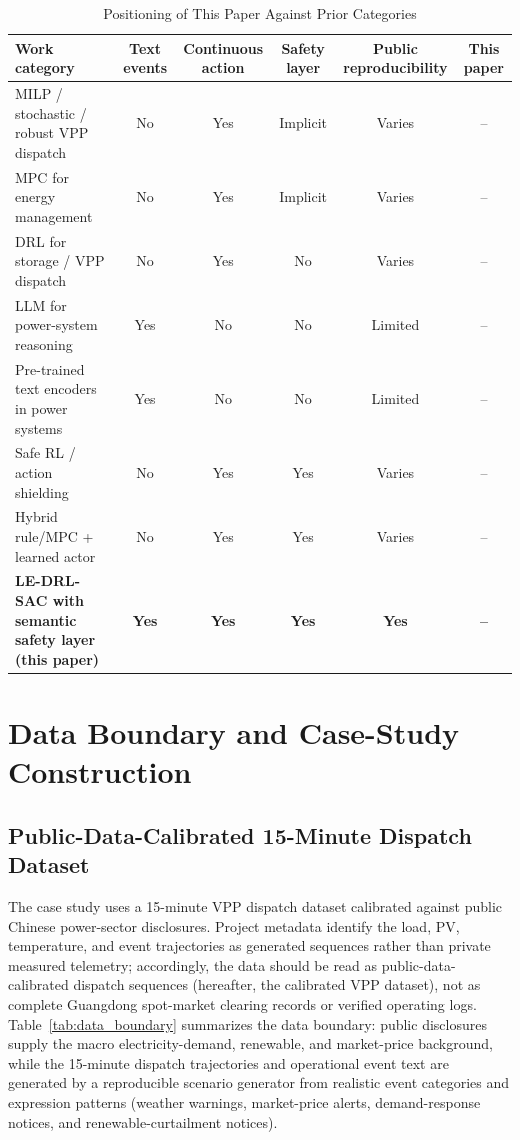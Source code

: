 \documentclass{ieeeaccess}
\begin{document}
\begin{table}[t!]
\caption{Positioning of This Paper Against Prior Categories}
\label{tab:related_position}
\centering
\begin{tabular}{lccccc}
\toprule
\textbf{Work category} & \textbf{Text events} & \textbf{Continuous action} & \textbf{Safety layer} & \textbf{Public reproducibility} & \textbf{This paper} \\
\midrule
MILP / stochastic / robust VPP dispatch \cite{b10,b13,b14,b15} & No & Yes & Implicit & Varies & -- \\
MPC for energy management \cite{b7,b16} & No & Yes & Implicit & Varies & -- \\
DRL for storage / VPP dispatch \cite{b9,b11,b12,b19} & No & Yes & No & Varies & -- \\
LLM for power-system reasoning \cite{b4,b5,b6} & Yes & No & No & Limited & -- \\
Pre-trained text encoders in power systems \cite{b21,b22} & Yes & No & No & Limited & -- \\
Safe RL / action shielding \cite{b23,b24,b25,b26} & No & Yes & Yes & Varies & -- \\
Hybrid rule/MPC + learned actor \cite{b8,b30,b31} & No & Yes & Yes & Varies & -- \\
\textbf{LE-DRL-SAC with semantic safety layer (this paper)} & \textbf{Yes} & \textbf{Yes} & \textbf{Yes} & \textbf{Yes} & \textbf{--} \\
\bottomrule
\end{tabular}
\end{table}

\section{Data Boundary and Case-Study Construction}
\label{sec:data}

\subsection{Public-Data-Calibrated 15-Minute Dispatch Dataset}
The case study uses a 15-minute VPP dispatch dataset calibrated against public Chinese power-sector disclosures. Project metadata identify the load, PV, temperature, and event trajectories as generated sequences rather than private measured telemetry; accordingly, the data should be read as public-data-calibrated dispatch sequences (hereafter, the calibrated VPP dataset), not as complete Guangdong spot-market clearing records or verified operating logs. Table~\ref{tab:data_boundary} summarizes the data boundary: public disclosures supply the macro electricity-demand, renewable, and market-price background, while the 15-minute dispatch trajectories and operational event text are generated by a reproducible scenario generator from realistic event categories and expression patterns (weather warnings, market-price alerts, demand-response notices, and renewable-curtailment notices).
\end{document}
